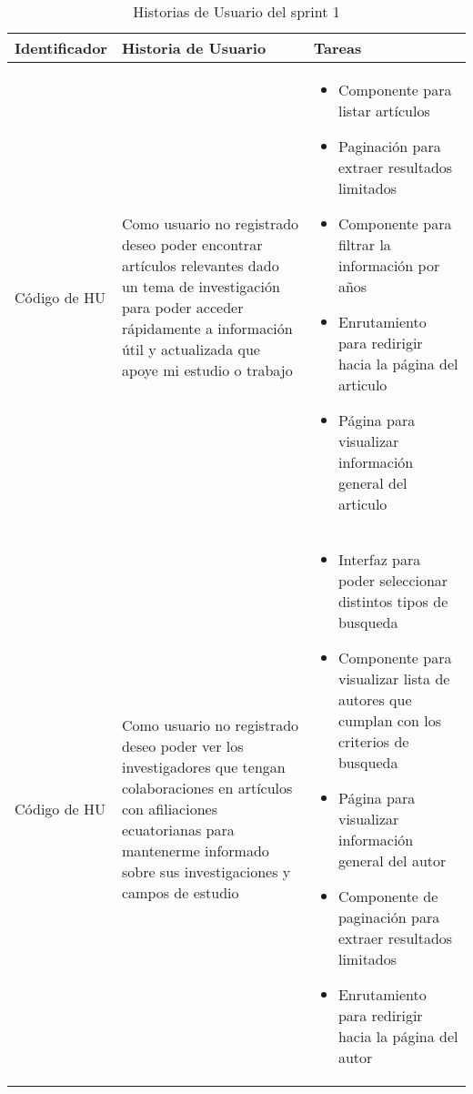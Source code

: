 \begin{table}[H]
    \centering
    \begin{tabular}{|m{2.5cm}|m{5cm}|m{6cm}|}
        \midrule
        \textbf{Identificador} & \textbf{Historia de Usuario}                                                                                                                                                                               & \textbf{Tareas} \\

        \hline
        Código de HU & Como usuario no registrado deseo poder encontrar artículos relevantes dado un  tema de investigación para poder acceder rápidamente a información útil y actualizada que apoye mi estudio o trabajo        &
        \begin{itemize}
            \item Componente para listar \break artículos
            \item Paginación para extraer resultados limitados
            \item Componente para filtrar la \break información por años
            \item Enrutamiento para redirigir hacia la página del articulo
            \item Página para visualizar \break información general del articulo

        \end{itemize}
        \\
        \hline
        Código de HU     & Como usuario no registrado deseo poder ver los investigadores que tengan colaboraciones en artículos con afiliaciones ecuatorianas para mantenerme informado sobre sus investigaciones y campos de estudio &
        \begin{itemize}
            \item Interfaz para poder seleccionar distintos tipos de busqueda
            \item Componente para visualizar lista de autores que cumplan con los criterios de busqueda
            \item Página para visualizar información general del autor
            \item Componente de paginación para extraer resultados limitados
            \item Enrutamiento para redirigir hacia la página del autor
        \end{itemize}
        \\
        \hline
        
    \end{tabular}
    \caption{Historias de Usuario del sprint 1}
    \label{C2T1:Historias de Usuario del Sprint 1}
\end{table}
